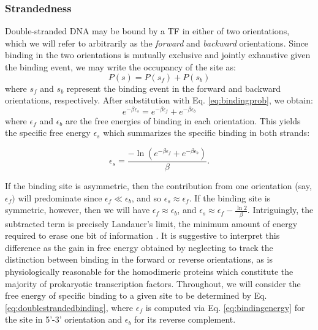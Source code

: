 \documentclass{article}
\begin{document}
\subsubsection{Strandedness}
Double-stranded DNA may be bound by a TF in either of two
orientations, which we will refer to arbitrarily as the
\textit{forward} and \textit{backward} orientations.  Since binding in
the two orientations is mutually exclusive and jointly exhaustive
given the binding event, we may write the occupancy of the site as:
\begin{equation}
P(s) = P(s_f) + P(s_b)
\end{equation}
where $s_f$ and $s_b$ represent the binding event in the forward and backward orientations, respectively.  After substitution with Eq. \ref{eq:bindingprob}, we obtain:
$$e^{-\beta \epsilon_s} = e^{-\beta \epsilon_f} + e^{-\beta \epsilon_b}$$
where $\epsilon_f$ and $\epsilon_b$ are the free energies of binding in
each orientation.  This yields the specific free energy
$\epsilon_s$ which summarizes the specific binding in both strands:

\begin{equation}
\label{eq:doublestrandedbinding}
\epsilon_s = \frac{-\ln(e^{-\beta \epsilon_f} + e^{-\beta \epsilon_b})}{\beta}.
\end{equation}

If the binding site is asymmetric, then the contribution from one
orientation (say, $\epsilon_f)$ will predominate since $\epsilon_f \ll
\epsilon_b$, and so $\epsilon_s \approx \epsilon_f$.  If the binding
site is symmetric, however, then we will have $\epsilon_f \approx
\epsilon_b$, and $\epsilon_s \approx \epsilon_f - \frac{\ln
  2}{\beta}$.  Intriguingly, the subtracted term is precisely Landauer's
limit, the minimum amount of energy required to erase one bit of
information  \cite{landauer61}. It is suggestive to interpret this
difference as the gain in free energy obtained by neglecting to track
the distinction between binding in the forward or reverse
orientations, as is physiologically reasonable for the homodimeric
proteins which constitute the majority of prokaryotic transcription
factors.  Throughout, we will consider the free energy of specific
binding to a given site to be determined by
Eq. \ref{eq:doublestrandedbinding}, where $\epsilon_f$ is computed via
Eq. \ref{eq:bindingenergy} for the site in 5'-3' orientation and
$\epsilon_b$ for its reverse complement.
\end{document}
